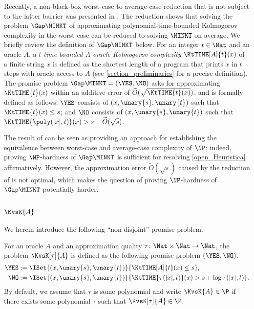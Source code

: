 \documentclass{toc}
\begin{document}
Recently, a non-black-box worst-case to average-case reduction
that is not subject to the latter barrier
was presented in \cite{Hirahara18_focs_conf}.
The reduction shows that solving
the problem $\Gap\MINKT$ of
approximating polynomial-time-bounded Kolmogorov complexity
in the worst case
can be reduced to solving $\MINKT$ on average.
We briefly review the definition of $\Gap\MINKT$ below.
For an integer $t \in \Nat$ and an oracle $A$,
a \emph{$t$-time-bounded $A$-oracle Kolmogorov complexity} $\KtTIME[A]{t}(x)$ of a finite string $x$
is defined as
the shortest length of a program that prints $x$ in $t$ steps
with oracle access to $A$ (see \cref{section_preliminaries} for a precise definition).
The promise problem $\Gap\MINKT = (\YES, \NO)$
%
asks for approximating $\KtTIME{t}(x)$ within an additive error of
$\widetilde{O}(\sqrt{\KtTIME{t}(x)})$,
and is formally defined as follows:
$\YES$ consists of $(x, \unary{s}, \unary{t})$ such that $\KtTIME{t}(x) \le s$;
and
$\NO$ consists of $(x, \unary{s}, \unary{t})$ such that $\KtTIME{\poly(|x|, t)}(x) > s + \widetilde{O}(\sqrt{s})$.

The result of \cite{Hirahara18_focs_conf}
can be seen as providing an approach for establishing the equivalence between worst-case and average-case complexity of $\NP$;
indeed,
proving $\NP$-hardness of $\Gap\MINKT$ is sufficient for resolving \cref{open_Heuristica} affirmatively.  %
However, the approximation error $\widetilde{O}(\sqrt{s})$ caused by the reduction of \cite{Hirahara18_focs_conf} is not optimal,
which makes the question of proving $\NP$-hardness of $\Gap\MINKT$ potentially harder.
%

\subsubsection{\texorpdfstring{$\KvsK{A}$}{Gap(K(A) vs K)}}
We herein introduce the following ``non-disjoint'' promise problem.
%
%
%
%

\begin{definition}
  For
  an oracle $A$ and an approximation quality $\tau \colon \Nat \times \Nat \to \Nat$,
  the problem $\KvsK[\tau]{A}$ %
  is defined as the following promise problem $(\YES, \NO)$.
  \begin{align*}
    \YES & := \ISet{ (x, \unary{s}, \unary{t}) } { \KtTIME[A]{t}(x) \le s },
    \\
    \NO  & := \ISet{ (x, \unary{s}, \unary{t}) } { \KtTIME{\tau(|x|, t)}(x) > s + \log \tau(|x|, t) }.
  \end{align*}
  By default, we assume that $\tau$ is some polynomial
  and write $\KvsK{A} \in \P$ if
  there exists some polynomial $\tau$ such that
  $\KvsK[\tau]{A} \in \P$.
\end{definition}
\end{document}
